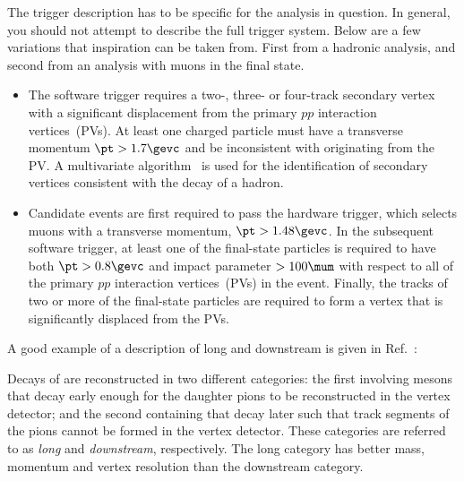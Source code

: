 The trigger description has to be specific for the analysis in
question. In general, you should not attempt to describe the full
trigger system. Below are a few variations that inspiration can be
taken from. First from a hadronic analysis, and second from an
analysis with muons in the final state.
\begin{itemize}
\item The software trigger requires a two-, three- or four-track
  secondary vertex with a significant displacement from the primary
  $pp$ interaction vertices~(PVs). At least one charged particle
  must have a transverse momentum $\pt > 1.7\gevc$ and be
  inconsistent with originating from the PV.
  A multivariate algorithm~\cite{BBDT} is used for
  the identification of secondary vertices consistent with the decay
  of a \bquark hadron.
\item Candidate events are first required to pass the hardware trigger,
  which selects muons with a transverse momentum, $\pt>1.48\gevc$. In
  the subsequent software trigger, at least
  one of the final-state particles is required to have both
  $\pt>0.8\gevc$ and impact parameter $>100\mum$ with respect to all
  of the primary $pp$ interaction vertices~(PVs) in the
  event. Finally, the tracks of two or more of the final-state
  particles are required to form a vertex that is significantly
  displaced from the PVs.
\end{itemize}

A good example of a description of long and downstream \KS is given in 
Ref.~\cite{LHCb-PAPER-2014-006}:

Decays of \decay{\KS}{\pip\pim} are reconstructed in two different categories:
the first involving \KS mesons that decay early enough for the
daughter pions to be reconstructed in the vertex detector; and the
second containing \KS that decay later such that track segments of the
pions cannot be formed in the vertex detector. These categories are
referred to as \emph{long} and \emph{downstream}, respectively. The
long category has better mass, momentum and vertex resolution than the
downstream category.

